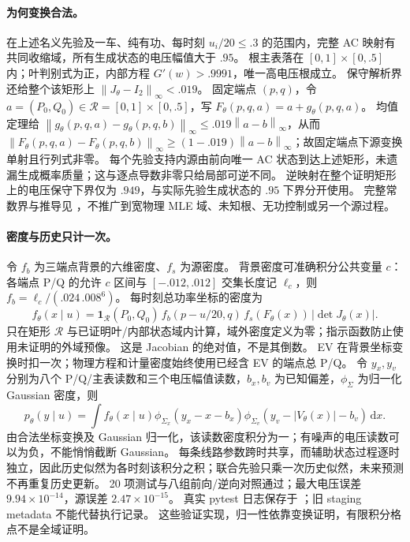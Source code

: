 \documentclass[UTF8,fontset=fandol,11pt,a4paper]{ctexart}
\newcommand{\norm}[1]{\left\lVert#1\right\rVert}
\begin{document}
\paragraph{为何变换合法。}
在上述名义先验及一车、纯有功、每时刻 $u_i/20\le.3$ 的范围内，完整 AC 映射有共同收缩域，所有生成状态的电压幅值大于 $.95$。
根主表落在 $[0,1]\times[0,.5]$ 内；叶判别式为正，内部方程 $G'(w)>.9991$，唯一高电压根成立。
保守解析界还给整个该矩形上 $\norm{J_\theta-I_2}_\infty<.019$。
固定端点 $(p,q)$，令 $a=(P_0,Q_0)\in\mathcal R=[0,1]\times[0,.5]$，写 $F_\theta(p,q,a)=a+g_\theta(p,q,a)$。
均值定理给 $\norm{g_\theta(p,q,a)-g_\theta(p,q,b)}_\infty\le.019\norm{a-b}_\infty$，从而
$\norm{F_\theta(p,q,a)-F_\theta(p,q,b)}_\infty\ge(1-.019)\norm{a-b}_\infty$；故固定端点下源变换单射且行列式非零。
每个先验支持内源由前向唯一 AC 状态到达上述矩形，未遗漏生成概率质量；这与逐点导数非零只给局部可逆不同。
逆映射在整个证明矩形上的电压保守下界仅为 $.949$，与实际先验生成状态的 $.95$ 下界分开使用。
完整常数界与推导见 ，不推广到宽物理 MLE 域、未知根、无功控制或另一个源过程。

\paragraph{密度与历史只计一次。}
令 $f_b$ 为三端点背景的六维密度、$f_s$ 为源密度。
背景密度可准确积分公共变量 $c$：各端点 P/Q 的允许 $c$ 区间与 $[-.012,.012]$ 交集长度记 $\ell_c$，则 $f_b=\ell_c/(.024\,.008^6)$。
每时刻总功率坐标的密度为
\begin{equation}
 f_\theta(x\mid u)=
 \mathbf1_{\mathcal R}(P_0,Q_0)\,f_b(p-u/20,q)\,f_s(F_\theta(x))\,|\det J_\theta(x)|.
 \label{eq:continuous-latent-density}
\end{equation}
只在矩形 $\mathcal R$ 与已证明叶/内部状态域内计算，域外密度定义为零；指示函数防止使用未证明的外域预像。
这是 Jacobian 的绝对值，不是其倒数。
EV 在背景坐标变换时扣一次；物理方程和计量密度始终使用已经含 EV 的端点总 P/Q。
令 $y_x,y_v$ 分别为八个 P/Q/主表读数和三个电压幅值读数，$b_x,b_v$ 为已知偏差，$\phi_\Sigma$ 为归一化 Gaussian 密度，则
\begin{equation}
 p_\theta(y\mid u)=\int f_\theta(x\mid u)
  \phi_{\Sigma_x}(y_x-x-b_x)
  \phi_{\Sigma_v}(y_v-|V_\theta(x)|-b_v)\,\mathrm dx.
 \label{eq:continuous-meter-density}
\end{equation}
由合法坐标变换及 Gaussian 归一化，该读数密度积分为一；有噪声的电压读数可以为负，不能悄悄截断 Gaussian。
每条线路参数跨时共享，而辅助状态过程逐时独立，因此历史似然为各时刻该积分之积；联合先验只乘一次历史似然，未来预测不再重复历史更新。
20 项测试与八组前向/逆向对照通过；最大电压误差 $9.94\times10^{-14}$，源误差 $2.47\times10^{-15}$。
真实 pytest 日志保存于 ；旧 staging metadata 不能代替执行记录。
这些验证实现，归一性依靠变换证明，有限积分格点不是全域证明。
\end{document}
